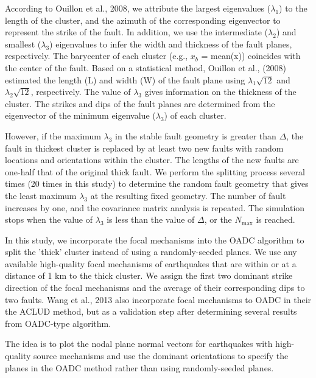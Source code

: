 \documentclass[draft]{agujournal2018}
\begin{document}
According to Ouillon et al., 2008, we attribute the largest eigenvalues ($\lambda_1$) to the length of the cluster, and the azimuth of the corresponding eigenvector to represent the strike of the fault. In addition, we use the intermediate ($\lambda_2$) and smallest ($\lambda_3$) eigenvalues to infer the width and thickness of the fault planes, respectively. The barycenter of each cluster (e.g., $x_b$ = mean(x)) coincides with the center of the fault. Based on a statistical method, Ouillon et al., (2008) estimated the length (L) and width (W) of the fault plane using  $\lambda_{1}\sqrt{12}$ and $\lambda_{2}\sqrt{12}$, respectively. The value of $\lambda_{3}$ gives information on the thickness of the cluster. The strikes and dips of the fault planes are determined from the eigenvector of the minimum eigenvalue ($\lambda_{3}$) of each cluster.

However, if the maximum $\lambda_{3}$ in the stable fault geometry is greater than $\Delta$, the fault in thickest cluster is replaced by at least two new faults with random locations and orientations within the cluster. The lengths of the new faults are one-half that of the original thick fault. We perform the splitting process several times (20 times in this study) to determine the random fault geometry that gives the least maximum $\lambda_3$ at the resulting fixed geometry. The number of fault increases by one, and the covariance matrix analysis is repeated. The simulation stops when the value of $\lambda_3$ is less than the value of $\Delta$, or the $N_{\max}$ is reached.

In this study, we incorporate the focal mechanisms into the OADC algorithm to split the 'thick' cluster instead of using a randomly-seeded planes. We use any available high-quality focal mechanisms of earthquakes that are within or at a distance of 1 km to the thick cluster. We assign the first two dominant strike direction of the focal mechanisms and the average of their corresponding dips to two faults. %
Wang et al., 2013 also incorporate focal mechanisms to OADC in their the ACLUD method, but as a validation step after determining several results from OADC-type algorithm. 


The idea is to plot the nodal plane normal vectors for earthquakes with high-quality source mechanisms and use the dominant orientations to specify the planes in the OADC method rather than using randomly-seeded planes. 
\end{document}
